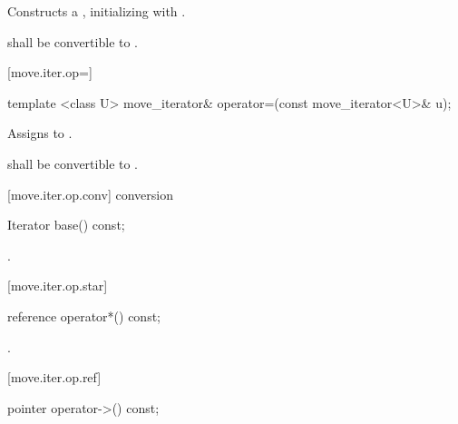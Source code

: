 \begin{itemdescr}
\pnum
\effects Constructs a , initializing
 with .

\pnum
\requires {} shall be convertible to
.
\end{itemdescr}

[move.iter.op=]{}

%
%
\begin{itemdecl}
template <class U> move_iterator& operator=(const move_iterator<U>& u);
\end{itemdecl}

\begin{itemdescr}
\pnum
\effects Assigns  to
.

\pnum
\requires {} shall be convertible to
.
\end{itemdescr}

[move.iter.op.conv]{ conversion}

%
%
\begin{itemdecl}
Iterator base() const;
\end{itemdecl}

\begin{itemdescr}
\pnum
\returns {}.
\end{itemdescr}

[move.iter.op.star]{}

%
%
\begin{itemdecl}
reference operator*() const;
\end{itemdecl}

\begin{itemdescr}
\pnum
\returns {}.
\end{itemdescr}

[move.iter.op.ref]{}

%
%
\begin{itemdecl}
pointer operator->() const;
\end{itemdecl}

